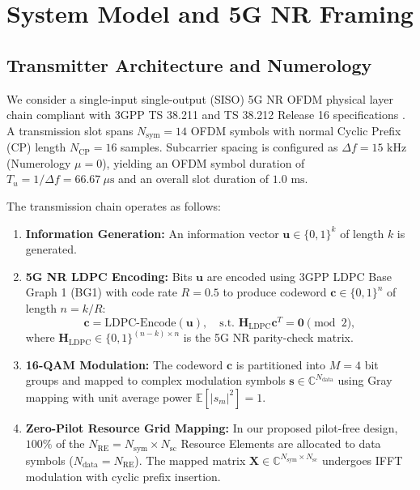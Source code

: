 \documentclass[journal]{IEEEtran}
\begin{document}
\section{System Model and 5G NR Framing}
\label{sec:system_model}

\subsection{Transmitter Architecture and Numerology}
We consider a single-input single-output (SISO) 5G NR OFDM physical layer chain compliant with 3GPP TS 38.211 and TS 38.212 Release 16 specifications \cite{3gpp38211}. A transmission slot spans $N_{\text{sym}} = 14$ OFDM symbols with normal Cyclic Prefix (CP) length $N_{\text{CP}} = 16$ samples. Subcarrier spacing is configured as $\Delta f = 15\text{ kHz}$ (Numerology $\mu = 0$), yielding an OFDM symbol duration of $T_u = 1/\Delta f = 66.67\ \mu\text{s}$ and an overall slot duration of $1.0\text{ ms}$.

The transmission chain operates as follows:
\begin{enumerate}
    \item \textbf{Information Generation:} An information vector $\mathbf{u} \in \{0, 1\}^k$ of length $k$ is generated.
    \item \textbf{5G NR LDPC Encoding:} Bits $\mathbf{u}$ are encoded using 3GPP LDPC Base Graph 1 (BG1) with code rate $R = 0.5$ to produce codeword $\mathbf{c} \in \{0, 1\}^n$ of length $n = k/R$:
    \begin{equation}
        \mathbf{c} = \text{LDPC-Encode}(\mathbf{u}), \quad \text{s.t. } \mathbf{H}_{\text{LDPC}} \mathbf{c}^T = \mathbf{0} \pmod 2,
    \end{equation}
    where $\mathbf{H}_{\text{LDPC}} \in \{0,1\}^{(n-k) \times n}$ is the 5G NR parity-check matrix.
    \item \textbf{16-QAM Modulation:} The codeword $\mathbf{c}$ is partitioned into $M = 4$ bit groups and mapped to complex modulation symbols $\mathbf{s} \in \mathbb{C}^{N_{\text{data}}}$ using Gray mapping with unit average power $\mathbb{E}[|s_m|^2] = 1$.
    \item \textbf{Zero-Pilot Resource Grid Mapping:} In our proposed pilot-free design, $100\%$ of the $N_{\text{RE}} = N_{\text{sym}} \times N_{\text{sc}}$ Resource Elements are allocated to data symbols ($N_{\text{data}} = N_{\text{RE}}$). The mapped matrix $\mathbf{X} \in \mathbb{C}^{N_{\text{sym}} \times N_{\text{sc}}}$ undergoes IFFT modulation with cyclic prefix insertion.
\end{enumerate}
\end{document}
